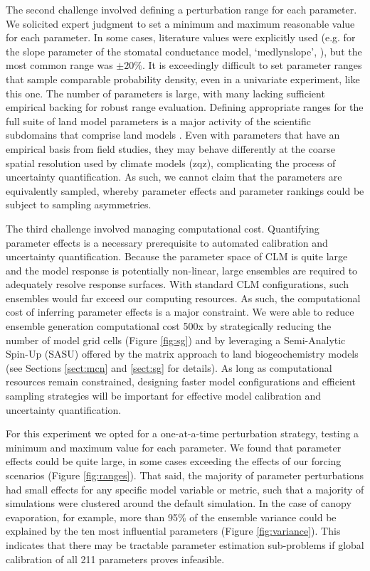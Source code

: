 \documentclass[draft]{agujournal2019}
\begin{document}
The second challenge involved defining a perturbation range for each parameter. We solicited expert judgment to set a minimum and maximum reasonable value for each parameter. In some cases, literature values were explicitly used (e.g. for the slope parameter of the stomatal conductance model, `medlynslope', ), but the most common range was $\pm20\%$. It is exceedingly difficult to set parameter ranges that sample comparable probability density, even in a univariate experiment, like this one. The number of parameters is large, with many lacking sufficient empirical backing for robust range evaluation. Defining appropriate ranges for the full suite of land model parameters is a major activity of the scientific subdomains that comprise land models \cite{kattge2020}. Even with parameters that have an empirical basis from field studies, they may behave differently at the coarse spatial resolution used by climate models (zqz), complicating the process of uncertainty quantification. As such, we cannot claim that the parameters are equivalently sampled, whereby parameter effects and parameter rankings could be subject to sampling asymmetries.

The third challenge involved managing computational cost. Quantifying parameter effects is a necessary prerequisite to automated calibration and uncertainty quantification. Because the parameter space of CLM is quite large and the model response is potentially non-linear, large ensembles are required to adequately resolve response surfaces. With standard CLM configurations, such ensembles would far exceed our computing resources. As such, the computational cost of inferring parameter effects is a major constraint. We were able to reduce ensemble generation computational cost 500x by strategically reducing the number of model grid cells (Figure \ref{fig:sg}) and by leveraging a Semi-Analytic Spin-Up (SASU) offered by the matrix approach to land biogeochemistry models \cite{lu2020,luo2022,liao2023} (see Sections \ref{sect:mcn} and \ref{sect:sg} for details). As long as computational resources remain constrained, designing faster model configurations and efficient sampling strategies will be important for effective model calibration and uncertainty quantification. 

For this experiment we opted for a one-at-a-time perturbation strategy, testing a minimum and maximum value for each parameter. We found that parameter effects could be quite large, in some cases exceeding the effects of our forcing scenarios (Figure \ref{fig:ranges}). That said, the majority of parameter perturbations had small effects for any specific model variable or metric, such that a majority of simulations were clustered around the default simulation. In the case of canopy evaporation, for example, more than 95\% of the ensemble variance could be explained by the ten most influential parameters (Figure \ref{fig:variance}). This indicates that there may be tractable parameter estimation sub-problems if global calibration of all 211 parameters proves infeasible. 
\end{document}
